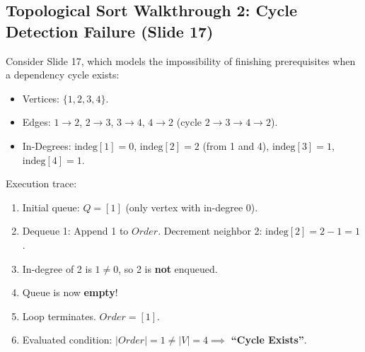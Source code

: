 \documentclass[10pt,journal,compsoc,onecolumn]{IEEEtran}
\begin{document}
\subsection{Topological Sort Walkthrough 2: Cycle Detection Failure (Slide 17)}
Consider Slide 17, which models the impossibility of finishing prerequisites when a dependency cycle exists:
\begin{itemize}
    \item Vertices: $\{1, 2, 3, 4\}$.
    \item Edges: $1 \to 2$, $2 \to 3$, $3 \to 4$, $4 \to 2$ (cycle $2 \to 3 \to 4 \to 2$).
    \item In-Degrees: $\text{indeg}[1] = 0$, $\text{indeg}[2] = 2$ (from 1 and 4), $\text{indeg}[3] = 1$, $\text{indeg}[4] = 1$.
\end{itemize}
Execution trace:
\begin{enumerate}
    \item Initial queue: $Q = [1]$ (only vertex with in-degree 0).
    \item Dequeue 1: Append 1 to $Order$. Decrement neighbor 2: $\text{indeg}[2] = 2 - 1 = 1$.
    \item In-degree of 2 is $1 \neq 0$, so 2 is \textbf{not} enqueued.
    \item Queue is now \textbf{empty}!
    \item Loop terminates. $Order = [1]$.
    \item Evaluated condition: $|Order| = 1 \neq |V| = 4 \implies$ \textbf{``Cycle Exists''}.
\end{enumerate}
\end{document}

